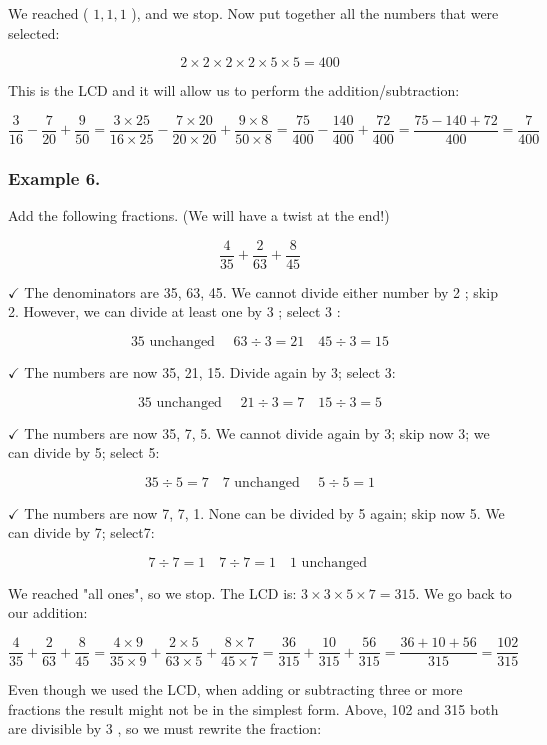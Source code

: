 \documentclass{ximera}
\begin{document}
We reached ( $1,1,1$ ), and we stop. Now put together all the numbers that were selected:

$$2 \times 2 \times 2 \times 2 \times 5 \times 5=400$$

This is the LCD and it will allow us to perform the addition/subtraction:

$$\frac{3}{16}-\frac{7}{20}+\frac{9}{50}=\frac{3 \times 25}{16 \times 25}-\frac{7 \times 20}{20 \times 20}+\frac{9 \times 8}{50 \times 8}=\frac{75}{400}-\frac{140}{400}+\frac{72}{400}=\frac{75-140+72}{400}=\frac{7}{400}$$

\subsubsection*{Example 6.}
Add the following fractions. (We will have a twist at the end!)

$$\frac{4}{35}+\frac{2}{63}+\frac{8}{45}$$

$\checkmark$ The denominators are 35, 63, 45. We cannot divide either number by 2 ; skip 2. However, we can divide at least one by 3 ; select 3 :

$$35 \text { unchanged } \quad 63 \div 3=21 \quad 45 \div 3=15$$

$\checkmark$ The numbers are now 35, 21, 15. Divide again by 3; select 3:

$$35 \text { unchanged } \quad 21 \div 3=7 \quad 15 \div 3=5$$

$\checkmark$ The numbers are now 35, 7, 5. We cannot divide again by 3; skip now 3; we can divide by 5; select 5:

$$35 \div 5=7 \quad 7 \text { unchanged } \quad 5 \div 5=1$$

$\checkmark$ The numbers are now 7, 7, 1. None can be divided by 5 again; skip now 5. We can divide by 7; select7:

$$7 \div 7=1 \quad 7 \div 7=1 \quad 1 \text { unchanged }$$

We reached "all ones", so we stop. The LCD is: $3 \times 3 \times 5 \times 7=315$. We go back to our addition:

$$\frac{4}{35}+\frac{2}{63}+\frac{8}{45}=\frac{4 \times 9}{35 \times 9}+\frac{2 \times 5}{63 \times 5}+\frac{8 \times 7}{45 \times 7}=\frac{36}{315}+\frac{10}{315}+\frac{56}{315}=\frac{36+10+56}{315}=\frac{102}{315}$$

Even though we used the LCD, when adding or subtracting three or more fractions the result might not be in the simplest form. Above, 102 and 315 both are divisible by 3 , so we must rewrite the fraction:
\end{document}
